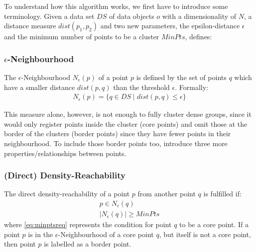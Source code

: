 To understand how this algorithm works, we first have to introduce some terminology.
Given a data set $DS$ of data objects $o$ with a dimensionality of $N$, a distance measure $dist(p_1,p_2)$ and two new parameters, the epsilon-distance $\epsilon$ and the minimum number of points to be a cluster $MinPts$, \citeauthor{DBSCANEKSX96} defines:

\subsubsection*{$\epsilon$-Neighbourhood}
The $\epsilon$-Neighbourhood $N_{\epsilon}(p)$ of a point $p$ is defined by the set of points $q$ which have a smaller distance $dist(p,q)$ than the threshold $\epsilon$. Formally: 
\begin{align}
    N_{\epsilon}(p)=\{q \in DS \mid dist(p,q) \leq \epsilon\}
\end{align}

This measure alone, however, is not enough to fully cluster dense groups, since it would only register points inside the cluster (core points) and omit those at the border of the clusters (border points) since they have fewer points in their neighbourhood. To include those border points too, \citeauthor{DBSCANEKSX96} introduce three more properties/relationships between points.

\subsubsection*{(Direct) Density-Reachability}
The direct density-reachability of a point $p$ from another point $q$ is fulfilled if:
\begin{align}
    p \in N_{\epsilon}(q)\label{eq:pinN}\\
    |N_{\epsilon}(q)|\geq MinPts\label{eq:minptsreq}
\end{align}
where \autoref{eq:minptsreq} represents the condition for point \(q\) to be a core point. If a point \(p\) is in the $\epsilon$-Neighbourhood of a core point $q$, but itself is not a core point, then point $p$ is labelled as a border point. 

